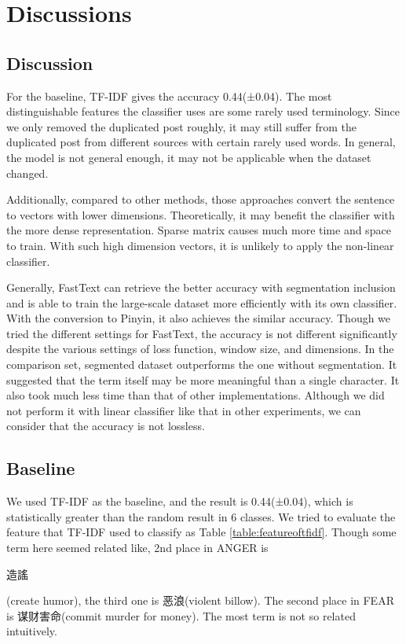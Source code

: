 \chapter{Discussions}


\section{Discussion}


For the baseline, TF-IDF gives the accuracy 0.44(±0.04). 
The most distinguishable features the classifier uses are some rarely used terminology. 
Since we only removed the duplicated post roughly, it may still suffer from the duplicated post from different sources with certain rarely used words. 
In general, the model is not general enough, it may not be applicable when the dataset changed. 

Additionally, compared to other methods, those approaches convert the sentence to vectors with lower dimensions.
Theoretically, it may benefit the classifier with the more dense representation. Sparse matrix causes much more time and space to train.
With such high dimension vectors, it is unlikely to apply the non-linear classifier.

Generally, FastText can retrieve the better accuracy with segmentation inclusion and is able to train the large-scale dataset more efficiently with its own classifier.
With the conversion to Pinyin, it also achieves the similar accuracy. Though we tried the different settings for FastText,
the accuracy is not different significantly despite the various settings of loss function, window size, and dimensions. 
In the comparison set, segmented dataset outperforms the one without segmentation. 
It suggested that the term itself may be more meaningful than a single character. It also took much less time than that of other implementations.
Although we did not perform it with linear classifier like that in other experiments, we can consider that the accuracy is not lossless.

\section{Baseline}

\begin{CJK}{UTF8}{gbsn}
We used TF-IDF as the baseline, and the result is 0.44(±0.04), which is statistically greater than the random result in 6 classes.
We tried to evaluate the feature that TF-IDF used to classify as Table \ref{table:featureoftfidf}. 
Though some term here seemed related like, 2nd place in ANGER is \begin{CJK}{UTF8}{bkai}造謠\end{CJK} (create humor), the third one is 恶浪(violent billow). 
The second place in FEAR is 谋财害命(commit murder for money). The most term is not so related intuitively. 
\end{CJK}

